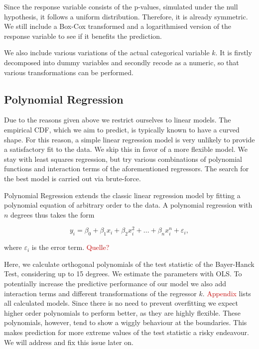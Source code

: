 \documentclass[12pt,a4paper]{article}
\begin{document}
Since the response variable consists of the p-values, simulated under
the null hypothesis, it follows a uniform distribution. Therefore, it is
already symmetric. We still include a Box-Cox transformed and a
logarithmised version of the response variable to see if it benefits the
prediction.

We also include various variations of the actual categorical variable
\(k\). It is firstly decomposed into dummy variables and secondly recode
as a numeric, so that various transformations can be performed.

\hypertarget{polynomial-regression}{%
\subsection{Polynomial Regression}\label{polynomial-regression}}

Due to the reasons given above we restrict ourselves to linear models.
The empirical \ac{CDF}, which we aim to predict, is typically known to
have a curved shape. For this reason, a simple linear regression model
is very unlikely to provide a satisfactory fit to the data. We skip this
in favor of a more flexible model. We stay with least squares
regression, but try various combinations of polynomial functions and
interaction terms of the aforementioned regressors. The search for the
best model is carried out via brute-force.

Polynomial Regression extends the classic linear regression model by
fitting a polynomial equation of arbitrary order to the data. A
polynomial regression with \(n\) degrees thus takes the form

\begin{equation}
    y_i = \beta_0 + \beta_1 x_i + \beta_2 x_i^2 + ... + \beta_n x_i^n + \varepsilon_i,
\label{eq:7}
\end{equation}

where \(\varepsilon_i\) is the error term. \textcolor{red}{Quelle?}

Here, we calculate orthogonal polynomials of the test statistic of the
Bayer-Hanck Test, considering up to 15 degrees. We estimate the
parameters with OLS. To potentially increase the predictive performance
of our model we also add interaction terms and different transformations
of the regressor \(k\). \textcolor{red}{Appendix} lists all calculated
models. Since there is no need to prevent overfitting we expect higher
order polynomials to perform better, as they are highly flexible. These
polynomials, however, tend to show a wiggly behaviour at the boundaries.
This makes prediction for more extreme values of the test statistic a
risky endeavour. We will address and fix this issue later on.
\end{document}
